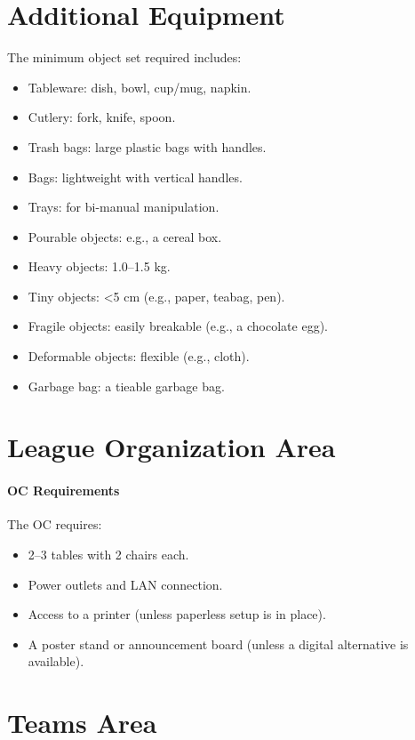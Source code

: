 \section{Additional Equipment}
The minimum object set required includes:
\begin{itemize}
    \item Tableware: dish, bowl, cup/mug, napkin.
    \item Cutlery: fork, knife, spoon.
    \item Trash bags: large plastic bags with handles.
    \item Bags: lightweight with vertical handles.
    \item Trays: for bi-manual manipulation.
    \item Pourable objects: e.g., a cereal box.
    \item Heavy objects: 1.0--1.5 kg.
    \item Tiny objects: \textless{}5 cm (e.g., paper, teabag, pen).
    \item Fragile objects: easily breakable (e.g., a chocolate egg).
    \item Deformable objects: flexible (e.g., cloth).
    \item Garbage bag: a tieable garbage bag.
\end{itemize}

\section{League Organization Area}
\paragraph{OC Requirements} The OC requires:
\begin{itemize}
    \item 2--3 tables with 2 chairs each.
    \item Power outlets and LAN connection.
    \item Access to a printer (unless paperless setup is in place).
    \item A poster stand or announcement board (unless a digital alternative is available).
\end{itemize}

\section{Teams Area}
